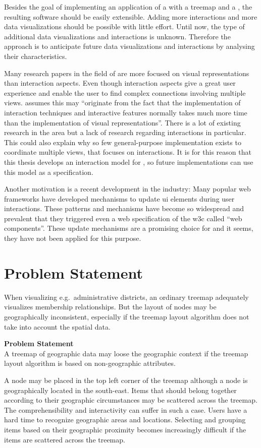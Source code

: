 Besides the goal of implementing an application of a \cmv{} with a treemap and a \gv{}, the resulting software should be easily extensible.
Adding more interactions and more data visualizations should be possible with little effort.
Until now, the type of additional data visualizations and interactions is unknown.
Therefore the approach is to anticipate future data visualizations and interactions by analysing their characteristics.

Many research papers in the field of \cmvs{} are more focused on visual representations than interaction aspects.
Even though interaction aspects give a great user experience and enable the user to find complex connections involving multiple views.
\textcite{Ho2013} assumes this may ``originate from the fact that the implementation of interaction techniques and interactive features normally takes much more time than the implementation of visual representations''.
There is a lot of existing research in the area but a lack of research regarding interactions in particular.
This could also explain why so few general-purpose implementation exists to coordinate multiple views, that focuses on interactions.
It is for this reason that this thesis develops an interaction model for \cmvs{}, so future implementations can use this model as a specification.

Another motivation is a recent development in the industry:
Many popular web frameworks have developed mechanisms to update \gls{ui} elements during user interactions.
These patterns and mechanisms have become so widespread and prevalent that they triggered even a web specification of the \gls{w3c} called ``web components''.
These update mechanisms are a promising choice for \cmvs{} and it seems, they have not been applied for this purpose.

\section{Problem Statement}
When visualizing e.g.\ administrative districts, an ordinary treemap adequately visualizes membership relationships.
But the layout of nodes may be geographically inconsistent, especially if the treemap layout algorithm does not take into account the spatial data.
\begin{tcolorbox}
\textbf{Problem Statement} \\
A treemap of geographic data may loose the geographic context if the treemap layout algorithm is based on non-geographic attributes.
\end{tcolorbox}
A node may be placed in the top left corner of the treemap although a node is geographically located in the south-east.
Items that should belong together according to their geographic circumstances may be scattered across the treemap.
The comprehensibility and interactivity can suffer in such a case.
Users have a hard time to recognize geographic areas and locations.
Selecting and grouping items based on their geographic proximity becomes increasingly difficult if the items are scattered across the treemap.

